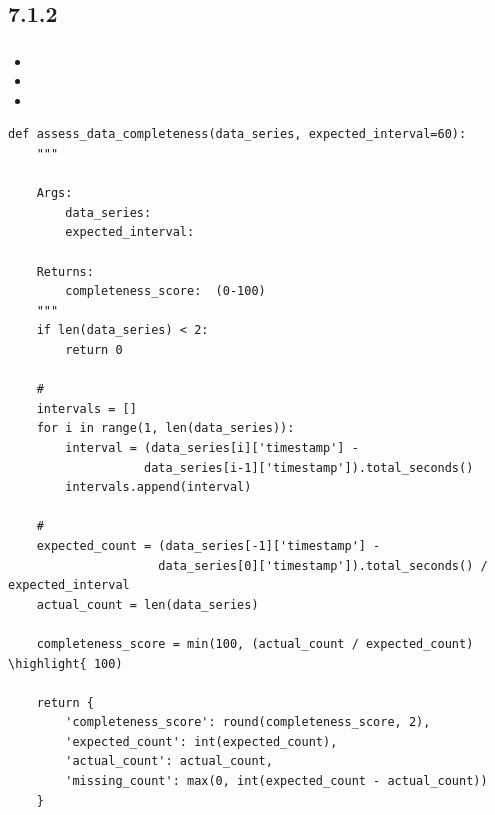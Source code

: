 \hypertarget{section-31}{%
\subsection{7.1.2}\label{section-31}}

\hypertarget{section-32}{%
\subsubsection{}\label{section-32}}

\hypertarget{section-33}{%
\paragraph{}\label{section-33}}

\begin{itemize}
\item
  \important{}
\item
  \important{}
\item
  \important{}
\end{itemize}

\begin{lstlisting}[style=python]
def assess_data_completeness(data_series, expected_interval=60):
    """

    Args:
        data_series: 
        expected_interval: 
    
    Returns:
        completeness_score:  (0-100)
    """
    if len(data_series) < 2:
        return 0
    
    # 
    intervals = []
    for i in range(1, len(data_series)):
        interval = (data_series[i]['timestamp'] - 
                   data_series[i-1]['timestamp']).total_seconds()
        intervals.append(interval)
    
    # 
    expected_count = (data_series[-1]['timestamp'] - 
                     data_series[0]['timestamp']).total_seconds() / expected_interval
    actual_count = len(data_series)
    
    completeness_score = min(100, (actual_count / expected_count) \highlight{ 100)
    
    return {
        'completeness_score': round(completeness_score, 2),
        'expected_count': int(expected_count),
        'actual_count': actual_count,
        'missing_count': max(0, int(expected_count - actual_count))
    }
\end{lstlisting}

\hypertarget{section-34}{%
\paragraph{}\label{section-34}}

